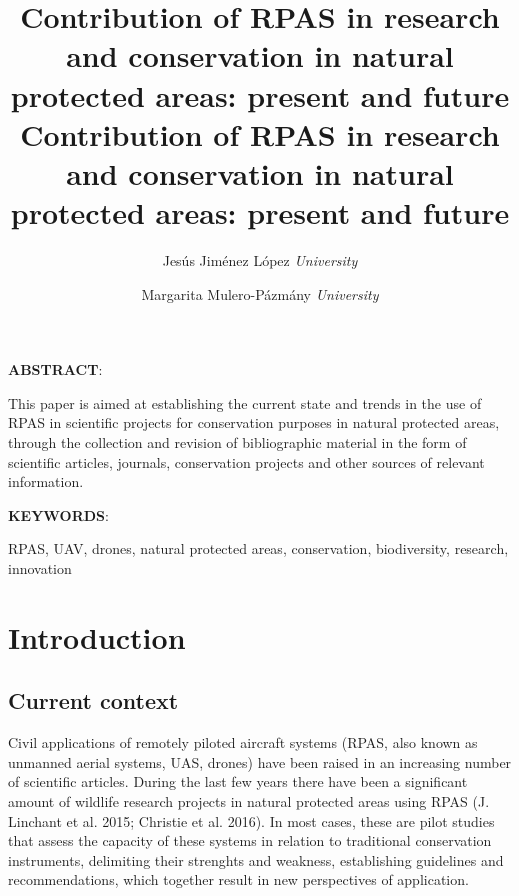 \documentclass[]{interact}
\title{Contribution of RPAS in research and conservation in natural protected
areas: present and future\vspace{0.25in}  }
\author{\Large Jesús Jiménez López\vspace{0.05in} \newline\normalsize\emph{University }   \and \Large Margarita Mulero-Pázmány\vspace{0.05in} \newline\normalsize\emph{University }  }
\date{}
\theoremstyle{plain}%
\theoremstyle{definition}
\theoremstyle{remark}
\begin{document}

%
\author{
}
\title{Contribution of RPAS in research and conservation in natural protected
areas: present and future}
\maketitle  %
  




  \textbf{ABSTRACT}: \par
  {This paper is aimed at establishing the current state and trends in the
use of RPAS in scientific projects for conservation purposes in natural
protected areas, through the collection and revision of bibliographic
material in the form of scientific articles, journals, conservation
projects and other sources of relevant information.}


    
   \textbf{KEYWORDS}: \par
   {RPAS, UAV, drones, natural protected areas, conservation, biodiversity,
research, innovation}

% 

\vskip 6.5pt

\noindent  \section{Introduction}\label{introduction}

\subsection{Current context}\label{current-context}

Civil applications of remotely piloted aircraft systems (RPAS, also
known as unmanned aerial systems, UAS, drones) have been raised in an
increasing number of scientific articles. During the last few years
there have been a significant amount of wildlife research projects in
natural protected areas using RPAS (J. Linchant et al. 2015; Christie et
al. 2016). In most cases, these are pilot studies that assess the
capacity of these systems in relation to traditional conservation
instruments, delimiting their strenghts and weakness, establishing
guidelines and recommendations, which together result in new
perspectives of application.
\end{document}
